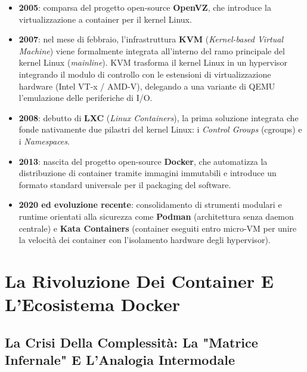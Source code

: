 \documentclass[11pt, a4paper]{article}
\begin{document}
\begin{itemize}
    \item \textbf{2005}: comparsa del progetto open-source \textbf{OpenVZ}, che introduce la virtualizzazione a container per il kernel Linux.
    \item \textbf{2007}: nel mese di febbraio, l'infrastruttura \textbf{KVM} (\emph{Kernel-based Virtual Machine}) viene formalmente integrata all'interno del ramo principale del kernel Linux (\emph{mainline}). KVM trasforma il kernel Linux in un hypervisor integrando il modulo di controllo con le estensioni di virtualizzazione hardware (Intel VT-x / AMD-V), delegando a una variante di QEMU l'emulazione delle periferiche di I/O.
    \item \textbf{2008}: debutto di \textbf{LXC} (\emph{Linux Containers}), la prima soluzione integrata che fonde nativamente due pilastri del kernel Linux: i \emph{Control Groups} (cgroups) e i \emph{Namespaces}.
    \item \textbf{2013}: nascita del progetto open-source \textbf{Docker}, che automatizza la distribuzione di container tramite immagini immutabili e introduce un formato standard universale per il packaging del software.
    \item \textbf{2020 ed evoluzione recente}: consolidamento di strumenti modulari e runtime orientati alla sicurezza come \textbf{Podman} (architettura senza daemon centrale) e \textbf{Kata Containers} (container eseguiti entro micro-VM per unire la velocità dei container con l'isolamento hardware degli hypervisor).
\end{itemize}

\newpage


\section{La Rivoluzione Dei Container E L'Ecosistema Docker}

\subsection{La Crisi Della Complessità: La "Matrice Infernale" E L'Analogia Intermodale}
\end{document}
